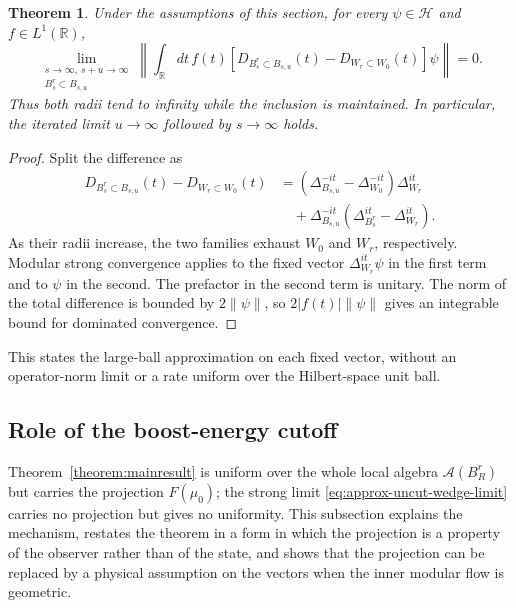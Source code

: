 \documentclass[a4paper,11pt]{article}
\newtheorem{theorem}{Theorem}
\theoremstyle{definition}
\begin{document}
\begin{theorem}\label{theorem:ballinsideball}
Under the assumptions of this section, for every $\psi\in\mathcal H$ and
$f\in L^1(\mathbb R)$,
\begin{equation}
 \lim_{\substack{s\to\infty,\ s+u\to\infty\\ B_s^r\subset B_{s,u}}}
 \left\|\int_{\mathbb R}dt\,f(t)
 [D_{B_s^r\subset B_{s,u}}(t)-D_{W_r\subset W_0}(t)]\psi\right\|=0.
 \label{eq:approx-ball-ball-limit}
\end{equation}
Thus both radii tend to infinity while the inclusion is maintained. In particular,
the iterated limit $u\to\infty$ followed by $s\to\infty$ holds.
\end{theorem}
\begin{proof}
Split the difference as
\begin{align}
 D_{B_s^r\subset B_{s,u}}(t)-D_{W_r\subset W_0}(t)
 &=(\Delta_{B_{s,u}}^{-it}-\Delta_{W_0}^{-it})\Delta_{W_r}^{it}\nonumber\\
 &\quad+\Delta_{B_{s,u}}^{-it}
 (\Delta_{B_s^r}^{it}-\Delta_{W_r}^{it}).
\end{align}
As their radii increase, the two families exhaust $W_0$ and $W_r$, respectively.
Modular strong convergence applies to the fixed vector $\Delta_{W_r}^{it}\psi$
in the first term and to $\psi$ in the second. The prefactor in the second term
is unitary. The norm of the total difference is bounded by $2\|\psi\|$,
so $2|f(t)|\|\psi\|$ gives an integrable bound for dominated convergence.
\end{proof}
This states the large-ball approximation on each fixed vector, without an
operator-norm limit or a rate uniform over the Hilbert-space unit ball.


\subsection{Role of the boost-energy cutoff}\label{subsec:cutoff}

Theorem~\ref{theorem:mainresult} is uniform over the whole local algebra $\mathcal A(B^r_R)$ but carries the projection $F(\mu_0)$; the strong limit \eqref{eq:approx-uncut-wedge-limit} carries no projection but gives no uniformity. This subsection explains the mechanism, restates the theorem in a form in which the projection is a property of the observer rather than of the state, and shows that the projection can be replaced by a physical assumption on the vectors when the inner modular flow is geometric.
\end{document}
